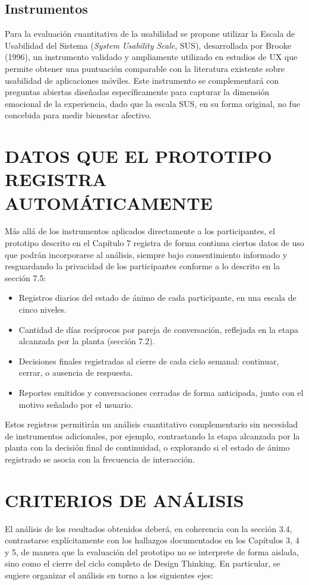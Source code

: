 \subsection{Instrumentos}
Para la evaluación cuantitativa de la usabilidad se propone utilizar la Escala de Usabilidad del Sistema (\textit{System Usability Scale}, SUS), desarrollada por Brooke (1996), un instrumento validado y ampliamente utilizado en estudios de UX que permite obtener una puntuación comparable con la literatura existente sobre usabilidad de aplicaciones móviles. Este instrumento se complementará con preguntas abiertas diseñadas específicamente para capturar la dimensión emocional de la experiencia, dado que la escala SUS, en su forma original, no fue concebida para medir bienestar afectivo.

\section{DATOS QUE EL PROTOTIPO REGISTRA AUTOMÁTICAMENTE}
Más allá de los instrumentos aplicados directamente a los participantes, el prototipo descrito en el Capítulo 7 registra de forma continua ciertos datos de uso que podrán incorporarse al análisis, siempre bajo consentimiento informado y resguardando la privacidad de los participantes conforme a lo descrito en la sección 7.5:

\begin{itemize}
    \item Registros diarios del estado de ánimo de cada participante, en una escala de cinco niveles.
    \item Cantidad de días recíprocos por pareja de conversación, reflejada en la etapa alcanzada por la planta (sección 7.2).
    \item Decisiones finales registradas al cierre de cada ciclo semanal: continuar, cerrar, o ausencia de respuesta.
    \item Reportes emitidos y conversaciones cerradas de forma anticipada, junto con el motivo señalado por el usuario.
\end{itemize}

Estos registros permitirán un análisis cuantitativo complementario sin necesidad de instrumentos adicionales, por ejemplo, contrastando la etapa alcanzada por la planta con la decisión final de continuidad, o explorando si el estado de ánimo registrado se asocia con la frecuencia de interacción.

\section{CRITERIOS DE ANÁLISIS}
El análisis de los resultados obtenidos deberá, en coherencia con la sección 3.4, contrastarse explícitamente con los hallazgos documentados en los Capítulos 3, 4 y 5, de manera que la evaluación del prototipo no se interprete de forma aislada, sino como el cierre del ciclo completo de Design Thinking. En particular, se sugiere organizar el análisis en torno a los siguientes ejes:

